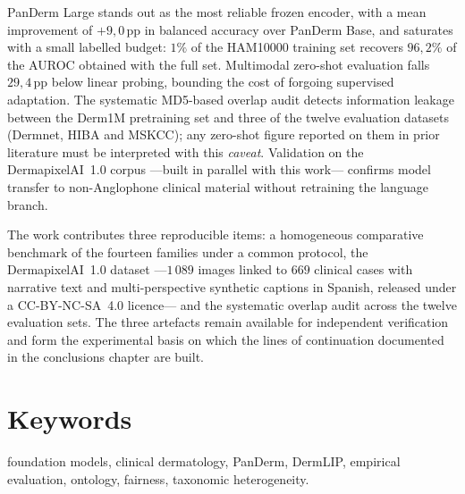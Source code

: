 PanDerm Large stands out as the most reliable frozen encoder, with a
mean improvement of $+9{,}0$\,pp in balanced accuracy over PanDerm
Base, and saturates with a small labelled budget: $1\%$ of the
HAM10000 training set recovers $96{,}2\%$ of the AUROC obtained with
the full set. Multimodal zero-shot evaluation falls $29{,}4$\,pp
below linear probing, bounding the cost of forgoing supervised
adaptation. The systematic MD5-based overlap audit detects
information leakage between the Derm1M pretraining set and three of
the twelve evaluation datasets (Dermnet, HIBA and MSKCC); any
zero-shot figure reported on them in prior literature must be
interpreted with this \emph{caveat}. Validation on the
DermapixelAI~1.0 corpus ---built in parallel with this work---
confirms model transfer to non-Anglophone clinical material without
retraining the language branch.

The work contributes three reproducible items: a homogeneous
comparative benchmark of the fourteen families under a common
protocol, the DermapixelAI~1.0 dataset ---$1\,089$ images linked to
$669$ clinical cases with narrative text and multi-perspective
synthetic captions in Spanish, released under a CC-BY-NC-SA~4.0
licence--- and the systematic overlap audit across the twelve
evaluation sets. The three artefacts remain available for
independent verification and form the experimental basis on which
the lines of continuation documented in the conclusions chapter are
built.

\section*{Keywords}
foundation models, clinical dermatology, PanDerm, DermLIP, empirical
evaluation, ontology, fairness, taxonomic heterogeneity.

